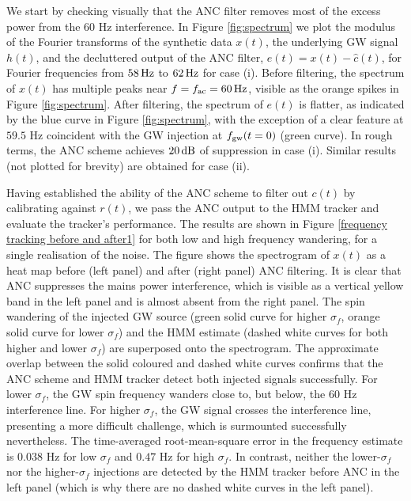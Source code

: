 \documentclass[pra,superscriptaddress,reprint,amsmath,amssymb,nofootinbib]{revtex4-2}
\begin{document}
We start by checking visually that the ANC filter removes most of the excess power from the 60 Hz interference. In Figure \ref{fig:spectrum} we plot the modulus of the Fourier transforms of the synthetic data $x(t)$, the underlying GW signal $h(t)$, and the decluttered output of the ANC filter, $e(t) = x(t) - \hat{c}(t)$, for Fourier frequencies from $58 \, {\rm Hz}$ to $62 \, {\rm Hz}$ for case (i). Before filtering, the spectrum of $x(t)$ has multiple peaks near $f = f_{\rm ac} = 60 \, {\rm Hz}$, visible as the orange spikes in Figure \ref{fig:spectrum}. After filtering, the spectrum of $e(t)$ is flatter, as indicated by the blue curve in Figure \ref{fig:spectrum}, with the exception of a clear feature at $59.5$ Hz coincident with the GW injection at $f_{\rm gw}(t=0)$ (green curve). In rough terms, the ANC scheme achieves $20 \, {\rm dB}$ of suppression in case (i). Similar results (not plotted for brevity) are obtained for case (ii). \newline 
 
Having established the ability of the ANC scheme to filter out $c(t)$ by calibrating against $r(t)$, we pass the ANC output to the HMM tracker and evaluate the tracker's performance. The results are shown in  Figure \ref{frequency tracking before and after1} for both low and high frequency wandering, for a single realisation of the noise. The figure shows the spectrogram of $x(t)$ as a heat map before (left panel) and after (right panel) ANC filtering. It is clear that ANC suppresses the mains power interference, which is visible as a vertical yellow band in the left panel and is almost absent from the right panel. The spin wandering of the injected GW source (green solid curve for higher $\sigma_f$, orange solid curve for lower $\sigma_f$) and the HMM estimate (dashed white curves for both higher and lower $\sigma_f$) are superposed onto the spectrogram. The approximate overlap between the solid coloured and dashed white curves confirms that the ANC scheme and HMM tracker detect both injected signals successfully. For lower $\sigma_f$, the GW spin frequency wanders close to, but below, the 60 Hz interference line. For higher $\sigma_f$, the GW signal crosses the interference line, presenting a more difficult challenge, which is surmounted successfully nevertheless. The time-averaged root-mean-square error in the frequency estimate is $0.038$ Hz for low $\sigma_f $ and $0.47$ Hz for high $\sigma_f$. In contrast, neither the lower-$\sigma_f$ nor the higher-$\sigma_f$ injections are detected by the HMM tracker before ANC in the left panel (which is why there are no dashed white curves in the left panel). 
\end{document}

